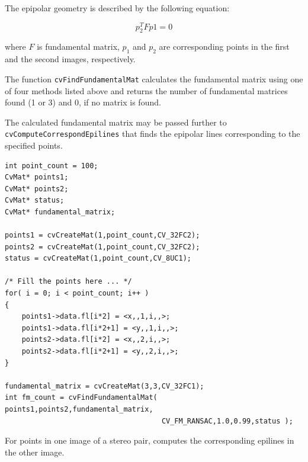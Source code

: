 The epipolar geometry is described by the following equation:

\[ p_2^T F p1=0 \]

where $F$ is fundamental matrix, $p_1$ and $p_2$ are corresponding points in the first and the second images, respectively.

The function \texttt{cvFindFundamentalMat} calculates the fundamental
matrix using one of four methods listed above and returns the number
of fundamental matrices found (1 or 3) and 0, if no matrix is found.

The calculated fundamental matrix may be passed further to
\texttt{cvComputeCorrespondEpilines} that finds the epipolar lines
corresponding to the specified points.

\begin{lstlisting}
int point_count = 100;
CvMat* points1;
CvMat* points2;
CvMat* status;
CvMat* fundamental_matrix;

points1 = cvCreateMat(1,point_count,CV_32FC2);
points2 = cvCreateMat(1,point_count,CV_32FC2);
status = cvCreateMat(1,point_count,CV_8UC1);

/* Fill the points here ... */
for( i = 0; i < point_count; i++ )
{
    points1->data.fl[i*2] = <x,,1,i,,>;
    points1->data.fl[i*2+1] = <y,,1,i,,>;
    points2->data.fl[i*2] = <x,,2,i,,>;
    points2->data.fl[i*2+1] = <y,,2,i,,>;
}

fundamental_matrix = cvCreateMat(3,3,CV_32FC1);
int fm_count = cvFindFundamentalMat( points1,points2,fundamental_matrix,
                                     CV_FM_RANSAC,1.0,0.99,status );
\end{lstlisting}

\label{ComputeCorrespondEpilines}

For points in one image of a stereo pair, computes the corresponding epilines in the other image.


\begin{description}
\end{description}

